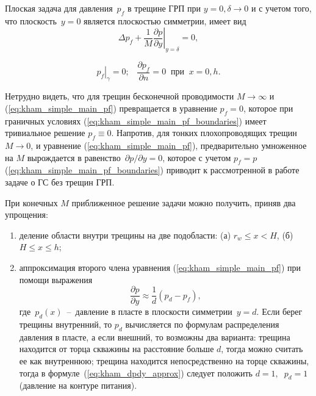 \documentclass{article}
\begin{document}
Плоская задача для давления~$p_f$ в трещине ГРП при $y=0, \delta \longrightarrow 0$ и с учетом того, что плоскость~$y=0$ является плоскостью симметрии, имеет вид
\begin{equation}
\displaystyle
\Delta p_f + \dfrac{1}{M} \left. \dfrac{\partial p}{\partial y} \right|_{y=\delta} = 0,
\label{eq:kham_simple_main_pf}
\end{equation}

\begin{equation}
\displaystyle
\left. p_f \right|_{\gamma} = 0; \;\;\; \dfrac{\partial p_f}{\partial n} = 0 \;\; \text{при} \;\;x=0, h.
\label{eq:kham_simple_main_pf_boundaries}
\end{equation}

Нетрудно видеть, что для трещин бесконечной проводимости $M \longrightarrow \infty$ и (\ref{eq:kham_simple_main_pf}) превращается в уравнение $p_f = 0$, которое при граничных условиях (\ref{eq:kham_simple_main_pf_boundaries}) имеет тривиальное решение $p_f \equiv 0$. Напротив, для тонких плохопроводящих трещин $M \longrightarrow 0$, и уравнение (\ref{eq:kham_simple_main_pf}), предварительно умноженное на $M$ вырождается в равенство~$\partial p/\partial y = 0$, которое с учетом $p_f = p$ (\ref{eq:kham_simple_main_pf_boundaries}) приводит к рассмотренной в работе \cite{ref:kham_mazo_uzku_2015} задаче о ГС без трещин ГРП.

При конечных $M$ приближенное решение задачи можно получить, приняв два упрощения:
\begin{enumerate}
\item деление области внутри трещины на две подобласти: (а) $r_w \leq x < H$, (б) $H \leq x \leq h$;
\item  аппроксимация второго члена уравнения (\ref{eq:kham_simple_main_pf}) при помощи выражения
\begin{equation}
\displaystyle
\dfrac{\partial p}{\partial y} \approx \dfrac{1}{d}\left(p_d - p_f\right),
\label{eq:kham_dpdy_approx}
\end{equation}
где~$p_d(x)$~--~давление в пласте в плоскости симметрии~$y=d$. Если берег трещины внутренний, то $p_d$ вычисляется по формулам распределения давления в  пласте, а если внешний, то возможны два варианта: трещина находится от торца скважины на расстояние больше $d$, тогда можно считать ее как внутреннюю; трещина находится непосредственно на торце скважины, тогда в формуле~(\ref{eq:kham_dpdy_approx}) следует положить $d = 1, \;\; p_d = 1$ (давление на контуре питания).
\end{enumerate}
\end{document}
